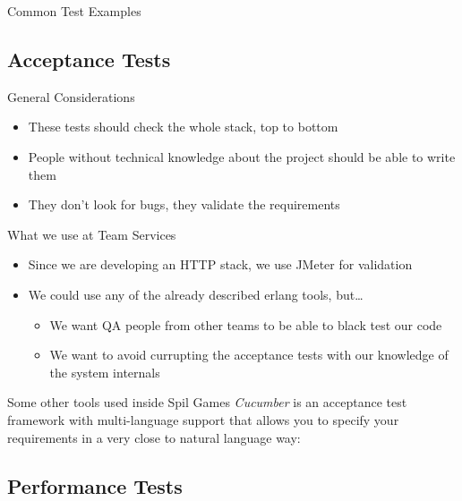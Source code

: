 \documentclass[pdf]{beamer}
\begin{document}
\begin{frame}{Common Test Examples}
\end{frame}

\subsection*{Acceptance Tests}
\label{acceptance_tests}

\begin{frame}{General Considerations}
    \begin{itemize}
    \item These tests should check the whole stack, top to bottom
    \pause
    \item People without technical knowledge about the project should be able to write them
    \pause
    \item They don't look for bugs, they validate the requirements
    \end{itemize}
\end{frame}

\begin{frame}{What we use at Team Services}
    \begin{itemize}
    \item Since we are developing an HTTP stack, we use JMeter for validation
    \pause
    \item We could use any of the already described erlang tools, but\dots
    \pause
        \begin{itemize}
        \item We want QA people from other teams to be able to black test our code
        \item We want to avoid currupting the acceptance tests with our knowledge of the system internals
        \end{itemize}
    \end{itemize}
\end{frame}

\begin{frame}{Some other tools used inside Spil Games}
    \emph{Cucumber} is an acceptance test framework with multi-language support that allows you to specify your
    requirements in a very close to natural language way:
\end{frame}

\subsection*{Performance Tests}
\label{performance_tests}
\end{document}
